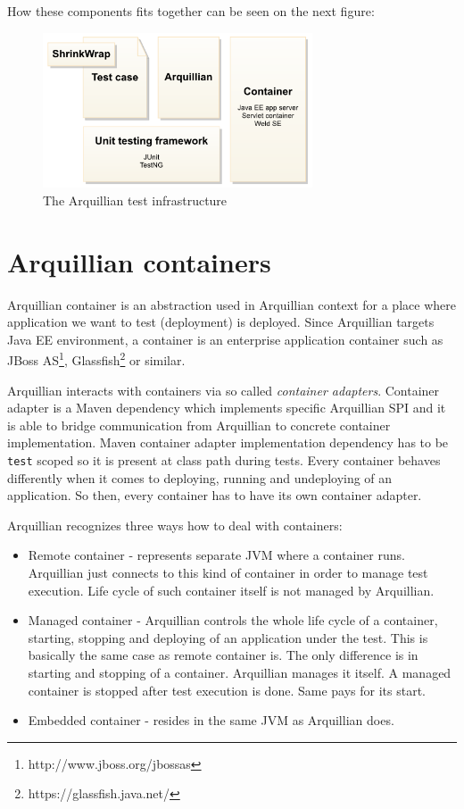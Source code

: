 \documentclass[12pt,final,oneside]{fithesis}
\begin{document}
How these components fits together can be seen on the next figure:

\begin{figure}[!ht]
	\centering
	\includegraphics[width=80mm]{img/architecture-overview.png}
	\caption{The Arquillian test infrastructure}
	\label{fig:arquillian_test_infrastructure}
\end{figure}

	\section{Arquillian containers}
	
Arquillian container is an abstraction used in Arquillian context for a place where application we want to test (deployment) is deployed. Since Arquillian targets Java EE environment, a container is an enterprise application container such as JBoss AS\footnote{http://www.jboss.org/jbossas}, Glassfish\footnote{https://glassfish.java.net/} or similar.

Arquillian interacts with containers via so called \textit{container adapters}. Container adapter is a Maven dependency which implements specific Arquillian SPI and it is able to bridge communication from Arquillian to concrete container implementation. Maven container adapter implementation dependency has to be \texttt{test} scoped so it is present at class path during tests. Every container behaves differently when it comes to deploying, running and undeploying of an application. So then, every container has to have its own container adapter.

Arquillian recognizes three ways how to deal with containers: 
	
\begin{itemize}
	\item{Remote container - represents separate JVM where a container runs. Arquillian just connects to this kind of container in order to manage test execution. Life cycle of such container itself is not managed by Arquillian.}
	\item{Managed container - Arquillian controls the whole life cycle of a container, starting, stopping and deploying of an application under the test. This is basically the same case as remote container is. The only difference is in starting and stopping of a container. Arquillian manages it itself. A managed container is stopped after test execution is done. Same pays for its start.} 
	\item{Embedded container - resides in the same JVM as Arquillian does.}
\end{itemize}	
\end{document}
